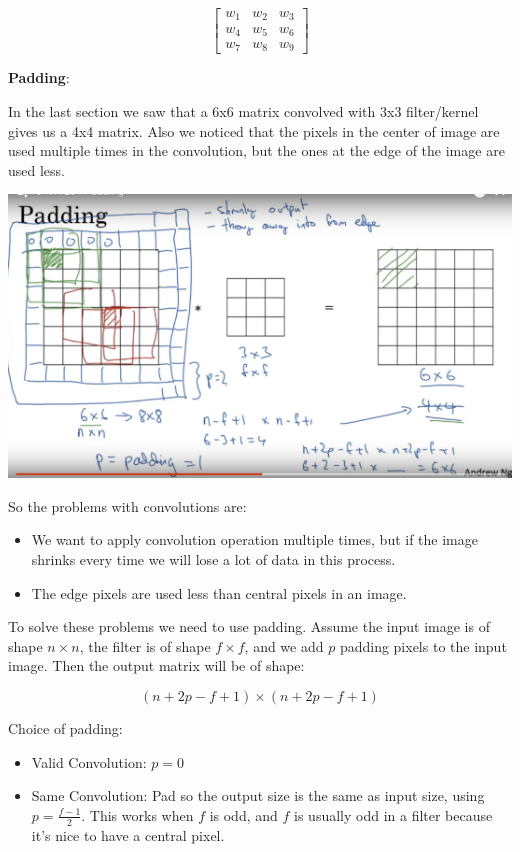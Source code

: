 \documentclass{article}
\begin{document}
\[
\begin{bmatrix}
w_{1} & w_{2} & w_{3}\\
w_{4} & w_{5} & w_{6}\\
w_{7} & w_{8} & w_{9}
\end{bmatrix}
\]

\noindent \textbf{Padding}:

\noindent In the last section we saw that a 6x6 matrix convolved with 3x3 filter/kernel gives us a 4x4 matrix. Also we noticed that the pixels in the center of image are used multiple times in the convolution, but the ones at the edge of the image are used less.

\begin{center}
\includegraphics[scale=0.4]{./images/padding.png}
\end{center}

\noindent So the problems with convolutions are:

\begin{itemize}
    \item We want to apply convolution operation multiple times, but if the image shrinks every time we will lose a lot of data in this process.
    \item The edge pixels are used less than central pixels in an image.
\end{itemize}

\noindent To solve these problems we need to use padding. Assume the input image is of shape \(n \times n\), the filter is of shape \(f \times f\), and we add \(p\) padding pixels to the input image. Then the output matrix will be of shape:

\[(n + 2p - f + 1) \times (n + 2p - f + 1)\]

\noindent Choice of padding:

\begin{itemize}
    \item Valid Convolution: \(p = 0\)
    \item Same Convolution: Pad so the output size is the same as input size, using \(p = \frac{f - 1}{2}\). This works when \(f\) is odd, and \(f\) is usually odd in a filter because it's nice to have a central pixel.
\end{itemize}
\end{document}
